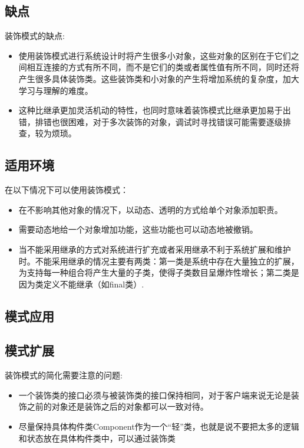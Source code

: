 \documentclass[letterpaper,10pt,english]{sphinxmanual}
\begin{document}
\subsection{缺点}
\label{\detokenize{structural_patterns/decorator:id11}}
\sphinxAtStartPar
装饰模式的缺点:
\begin{itemize}
\item {} 
\sphinxAtStartPar
使用装饰模式进行系统设计时将产生很多小对象，这些对象的区别在于它们之间相互连接的方式有所不同，而不是它们的类或者属性值有所不同，同时还将产生很多具体装饰类。这些装饰类和小对象的产生将增加系统的复杂度，加大学习与理解的难度。

\item {} 
\sphinxAtStartPar
这种比继承更加灵活机动的特性，也同时意味着装饰模式比继承更加易于出错，排错也很困难，对于多次装饰的对象，调试时寻找错误可能需要逐级排查，较为烦琐。

\end{itemize}


\subsection{适用环境}
\label{\detokenize{structural_patterns/decorator:id12}}
\sphinxAtStartPar
在以下情况下可以使用装饰模式：
\begin{itemize}
\item {} 
\sphinxAtStartPar
在不影响其他对象的情况下，以动态、透明的方式给单个对象添加职责。

\item {} 
\sphinxAtStartPar
需要动态地给一个对象增加功能，这些功能也可以动态地被撤销。

\item {} 
\sphinxAtStartPar
当不能采用继承的方式对系统进行扩充或者采用继承不利于系统扩展和维护时。不能采用继承的情况主要有两类：第一类是系统中存在大量独立的扩展，为支持每一种组合将产生大量的子类，使得子类数目呈爆炸性增长；第二类是因为类定义不能继承（如final类）.

\end{itemize}


\subsection{模式应用}
\label{\detokenize{structural_patterns/decorator:id13}}

\subsection{模式扩展}
\label{\detokenize{structural_patterns/decorator:id14}}
\sphinxAtStartPar
装饰模式的简化\sphinxhyphen{}需要注意的问题:
\begin{itemize}
\item {} 
\sphinxAtStartPar
一个装饰类的接口必须与被装饰类的接口保持相同，对于客户端来说无论是装饰之前的对象还是装饰之后的对象都可以一致对待。

\item {} 
\sphinxAtStartPar
尽量保持具体构件类Component作为一个“轻”类，也就是说不要把太多的逻辑和状态放在具体构件类中，可以通过装饰类

\end{itemize}
\end{document}
